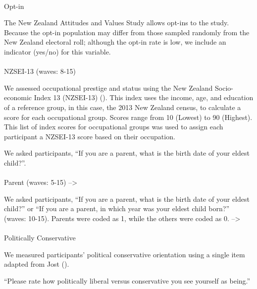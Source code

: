 \documentclass[
  singlecolumn]{article}
\makeatletter
\let\oldparagraph\paragraph
\renewcommand{\paragraph}{
    \@ifstar
      \xxxParagraphStar
      \xxxParagraphNoStar
  }
\newcommand{\xxxParagraphStar}[1]{\oldparagraph*{#1}\mbox{}}
\newcommand{\xxxParagraphNoStar}[1]{\oldparagraph{#1}\mbox{}}
\makeatother
\begin{document}
\paragraph{Opt-in}\label{opt-in}

The New Zealand Attitudes and Values Study allows opt-ins to the study.
Because the opt-in population may differ from those sampled randomly
from the New Zealand electoral roll; although the opt-in rate is low, we
include an indicator (yes/no) for this variable.

\paragraph{NZSEI-13 (waves: 8-15)}\label{nzsei-13-waves-8-15}

We assessed occupational prestige and status using the New Zealand
Socio-economic Index 13 (NZSEI-13) (). This index uses the income, age, and education of
a reference group, in this case, the 2013 New Zealand census, to
calculate a score for each occupational group. Scores range from 10
(Lowest) to 90 (Highest). This list of index scores for occupational
groups was used to assign each participant a NZSEI-13 score based on
their occupation.

We asked participants, ``If you are a parent, what is the birth date of
your eldest child?''.

\paragraph{Parent (waves: 5-15)
--\textgreater{}}\label{parent-waves-5-15}

We asked participants, ``If you are a parent, what is the birth date of
your eldest child?'' or ``If you are a parent, in which year was your
eldest child born?'' (waves: 10-15). Parents were coded as 1, while the
others were coded as 0. --\textgreater{}

\paragraph{Politically Conservative}\label{politically-conservative}

We measured participants' political conservative orientation using a
single item adapted from Jost ().

``Please rate how politically liberal versus conservative you see
yourself as being.''
\end{document}
